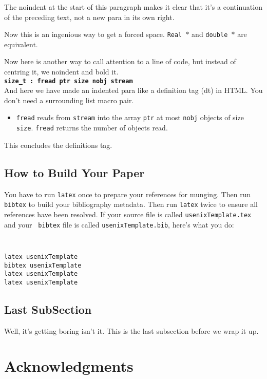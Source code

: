 \documentclass[letterpaper,twocolumn,10pt]{article}
\begin{document}
\noindent
The noindent at the start of this paragraph makes it clear that it's
a continuation of the preceding text, not a new para in its own right.


Now this is an ingenious way to get a forced space.
{\tt Real~$*$} and {\tt double~$*$} are equivalent.

Now here is another way to call attention to a line of code, but instead
of centring it, we noindent and bold it.\\

\noindent
{\bf \tt size\_t : fread ptr size nobj stream } \\

And here we have made an indented para like a definition tag (dt)
in HTML.  You don't need a surrounding list macro pair.
\begin{itemize}
\item[]  {\tt fread} reads from {\tt stream} into the array {\tt ptr} at
most {\tt nobj} objects of size {\tt size}.   {\tt fread} returns
the number of objects read.
\end{itemize}
This concludes the definitions tag.

\subsection{How to Build Your Paper}

You have to run {\tt latex} once to prepare your references for
munging.  Then run {\tt bibtex} to build your bibliography metadata.
Then run {\tt latex} twice to ensure all references have been resolved.
If your source file is called {\tt usenixTemplate.tex} and your {\tt
  bibtex} file is called {\tt usenixTemplate.bib}, here's what you do:
{\tt \small
\begin{verbatim}
latex usenixTemplate
bibtex usenixTemplate
latex usenixTemplate
latex usenixTemplate
\end{verbatim}
}


\subsection{Last SubSection}

Well, it's getting boring isn't it.  This is the last subsection
before we wrap it up.

\section{Acknowledgments}
\end{document}
